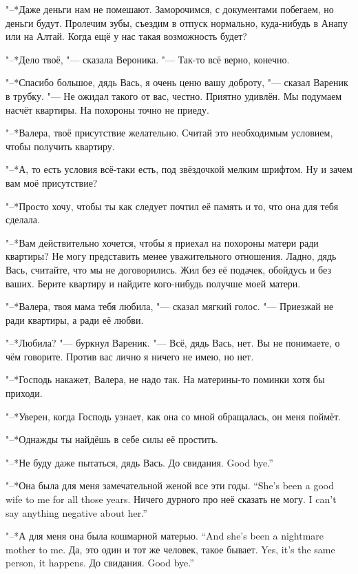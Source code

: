 "--*Даже деньги нам не помешают.
Заморочимся, с документами побегаем, но деньги будут.
Пролечим зубы, съездим в отпуск нормально, куда-нибудь в Анапу или на Алтай.
Когда ещё у нас такая возможность будет?

"--*Дело твоё, "--- сказала Вероника.
"--- Так-то всё верно, конечно.

"--*Спасибо большое, дядь Вась, я очень ценю вашу доброту, "--- сказал Вареник в трубку.
"--- Не ожидал такого от вас, честно.
Приятно удивлён.
Мы подумаем насчёт квартиры.
На похороны точно не приеду.

"--*Валера, твоё присутствие желательно.
Считай это необходимым условием, чтобы получить квартиру.

"--*А, то есть условия всё-таки есть, под звёздочкой мелким шрифтом.
Ну и зачем вам моё присутствие?

"--*Просто хочу, чтобы ты как следует почтил её память и то, что она для тебя сделала.

"--*Вам действительно хочется, чтобы я приехал на похороны матери ради квартиры?
Не могу представить менее уважительного отношения.
Ладно, дядь Вась, считайте, что мы не договорились.
Жил без её подачек, обойдусь и без ваших.
Берите квартиру и найдите кого-нибудь получше моей матери.

"--*Валера, твоя мама тебя любила, "--- сказал мягкий голос.
"--- Приезжай не ради квартиры, а ради её любви.

"--*Любила? "--- буркнул Вареник.
"--- Всё, дядь Вась, нет.
Вы не понимаете, о чём говорите.
Против вас лично я ничего не имею, но нет.

"--*Господь накажет, Валера, не надо так.
На материны-то поминки хотя бы приходи.

"--*Уверен, когда Господь узнает, как она со мной обращалась, он меня поймёт.

"--*Однажды ты найдёшь в себе силы её простить.

"--*Не буду даже пытаться, дядь Вась.
{До свидания.}
{Good bye.''}

{"--*Она была для меня замечательной женой все эти годы.}
{``She's been a good wife to me for all those years.}
{Ничего дурного про неё сказать не могу.}
{I can't say anything negative about her.''}

{"--*А для меня она была кошмарной матерью.}
{``And she's been a nightmare mother to me.}
{Да, это один и тот же человек, такое бывает.}
{Yes, it's the same person, it happens.}
{До свидания.}
{Good bye.''}


